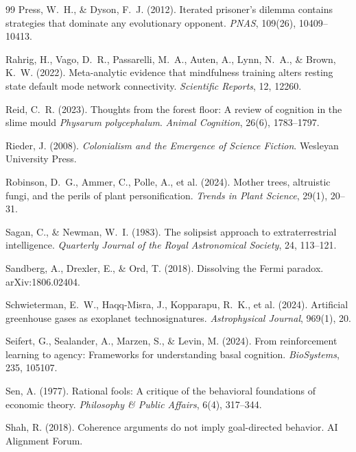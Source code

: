 \documentclass[11pt,a4paper,twocolumn]{article}
\begin{document}
\begin{thebibliography}{99}
 Press, W.~H., \& Dyson, F.~J. (2012). Iterated prisoner's dilemma contains strategies that dominate any evolutionary opponent. \textit{PNAS}, 109(26), 10409--10413.

 Rahrig, H., Vago, D.~R., Passarelli, M.~A., Auten, A., Lynn, N.~A., \& Brown, K.~W. (2022). Meta-analytic evidence that mindfulness training alters resting state default mode network connectivity. \textit{Scientific Reports}, 12, 12260.

 Reid, C.~R. (2023). Thoughts from the forest floor: A review of cognition in the slime mould \textit{Physarum polycephalum}. \textit{Animal Cognition}, 26(6), 1783--1797.

 Rieder, J. (2008). \textit{Colonialism and the Emergence of Science Fiction}. Wesleyan University Press.

 Robinson, D.~G., Ammer, C., Polle, A., et al. (2024). Mother trees, altruistic fungi, and the perils of plant personification. \textit{Trends in Plant Science}, 29(1), 20--31.

 Sagan, C., \& Newman, W.~I. (1983). The solipsist approach to extraterrestrial intelligence. \textit{Quarterly Journal of the Royal Astronomical Society}, 24, 113--121.

 Sandberg, A., Drexler, E., \& Ord, T. (2018). Dissolving the Fermi paradox. arXiv:1806.02404.

 Schwieterman, E.~W., Haqq-Misra, J., Kopparapu, R.~K., et al. (2024). Artificial greenhouse gases as exoplanet technosignatures. \textit{Astrophysical Journal}, 969(1), 20.

 Seifert, G., Sealander, A., Marzen, S., \& Levin, M. (2024). From reinforcement learning to agency: Frameworks for understanding basal cognition. \textit{BioSystems}, 235, 105107.

 Sen, A. (1977). Rational fools: A critique of the behavioral foundations of economic theory. \textit{Philosophy \& Public Affairs}, 6(4), 317--344.

 Shah, R. (2018). Coherence arguments do not imply goal-directed behavior. AI Alignment Forum.


\end{thebibliography}
\end{document}
